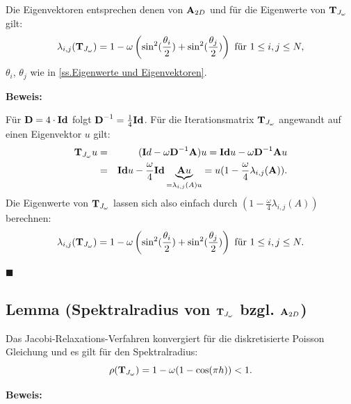 Die Eigenvektoren entsprechen denen von ${\textbf{A}}_{2D}$ und für die Eigenwerte von ${\textbf{T}}_{J_{\omega}}$ gilt:
\begin{equation}
\lambda_{i,j}({\textbf{T}}_{J_{\omega}}) = 1 - \omega \left(\sin^{2}(\frac {\theta_{i}} {2}) + \sin^{2}(\frac {\theta_{j}} {2}) \right) \textnormal{ für } 1 \le i,j \le N,\label{eq.Jacobi-Relaxation-Eigenwerte}
\end{equation}
$\theta_{i}$, $\theta_{j}$ wie in \autoref{ss.Eigenwerte und Eigenvektoren}.

\textbf{Beweis:}\label{sss.EW JacobiRelax}

Für ${\textbf{D}} = 4 \cdot {\textbf{Id}}$ folgt ${\textbf{D}}^{-1} = \frac {1} {4} {\textbf{Id}}$. Für die Iterationsmatrix ${\textbf{T}}_{J_{\omega}}$ angewandt auf einen Eigenvektor $u$ gilt:
\begin{eqnarray}
{\textbf{T}}_{J_{\omega}}u &=& ({\textbf{I}}d - \omega {\textbf{D}}^{-1}{\textbf{A}})u = {\textbf{Id}} u - \omega {\textbf{D}}^{-1} {\textbf{A}} u \notag \\
&=&{\textbf{Id}} u - \frac {\omega} {4} {\textbf{Id}} \underbrace{{\textbf{A}}u}_{=\lambda_{i,j}(A) u} = u (1 - \frac {\omega} {4} \lambda_{i,j}({\textbf{A}})). \notag
\end{eqnarray}
Die Eigenwerte von ${\textbf{T}}_{J_{\omega}}$ lassen sich also einfach durch $(1 - \frac {\omega} {4} \lambda_{i,j}(A))$ berechnen:
\begin{equation}
\lambda_{i,j}({\textbf{T}}_{J_{\omega}}) = 1 - \omega \left(\sin^{2}(\frac {\theta_{i}} {2}) + \sin^{2}(\frac {\theta_{j}} {2}) \right) \textnormal{ für } 1 \le i,j \le N. \notag
\end{equation}
\begin{flushright}
$\blacksquare$
\end{flushright}

\subsection{Lemma (Spektralradius von ${\textbf{T}}_{J_{\omega}}$ bzgl. ${\textbf{A}}_{2D}$)}\label{ss.Spektralradius Jacobi Relax}

Das Jacobi-Relaxations-Verfahren konvergiert für die diskretisierte Poisson Gleichung und es gilt für den Spektralradius:
\begin{equation}
\rho({\textbf{T}}_{J_{\omega}}) = 1 - \omega(1 - \cos (\pi h)) < 1.
\end{equation}

\textbf{Beweis:}\label{b.Spektral JacobiRelax}

